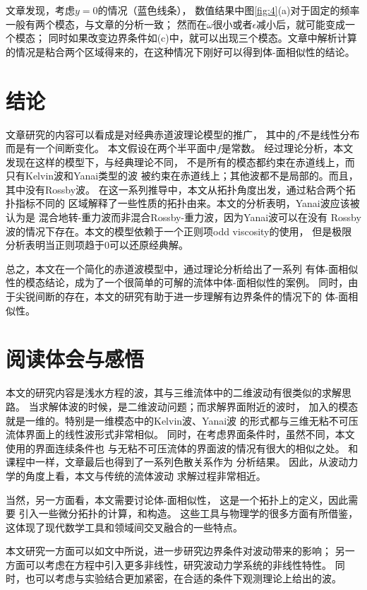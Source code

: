 \documentclass[UTF8,zihao=5]{ctexart} %
\begin{document}
文章发现，考虑$y=0$的情况（蓝色线条），
数值结果中图\ref{fig:4}(a)对于固定的频率一般有两个模态，与文章的分析一致；
然而在$\omega$很小或者$\epsilon$减小后，就可能变成一个模态；
同时如果改变边界条件如(c)中，就可以出现三个模态。文章中解析计算
的情况是粘合两个区域得来的，在这种情况下刚好可以得到体-面相似性的结论。

\section{结论}
文章研究的内容可以看成是对经典赤道波理论模型的推广，
其中的$f$不是线性分布而是有一个间断变化。
本文假设在两个半平面中$f$是常数。
经过理论分析，本文发现在这样的模型下，与经典理论不同，
不是所有的模态都约束在赤道线上，而只有Kelvin波和Yanai类型的波
被约束在赤道线上；其他波都不是局部的。而且，其中没有Rossby波。
在这一系列推导中，本文从拓扑角度出发，通过粘合两个拓扑指标不同的
区域解释了一些性质的拓扑由来。本文的分析表明，Yanai波应该被认为是
混合地转-重力波而非混合Rossby-重力波，因为Yanai波可以在没有
Rossby波的情况下存在。本文的模型依赖于一个正则项odd viscosity的使用，
但是极限分析表明当正则项趋于0可以还原经典解。

总之，本文在一个简化的赤道波模型中，通过理论分析给出了一系列
有体-面相似性的模态结论，成为了一个很简单的可解的流体中体-面相似性的案例。
同时，由于尖锐间断的存在，本文的研究有助于进一步理解有边界条件的情况下的
体-面相似性。

\section{阅读体会与感悟}
本文的研究内容是浅水方程的波，其与三维流体中的二维波动有很类似的求解思路。
当求解体波的时候，是二维波动问题；而求解界面附近的波时，
加入的模态就是一维的。特别是一维模态中的Kelvin波、Yanai波
的形式都与三维无粘不可压流体界面上的线性波形式非常相似。
同时，在考虑界面条件时，虽然不同，本文使用的界面连续条件也
与无粘不可压流体的界面波的情况有很大的相似之处。
和课程中一样，文章最后也得到了一系列色散关系作为
分析结果。
因此，从波动力学的角度上看，本文与传统的流体波动
求解过程非常相近。

当然，另一方面看，本文需要讨论体-面相似性，
这是一个拓扑上的定义，因此需要
引入一些微分拓扑的计算，和构造。
这些工具与物理学的很多方面有所借鉴，
这体现了现代数学工具和领域间交叉融合的一些特点。

本文研究一方面可以如文中所说，进一步研究边界条件对波动带来的影响；
另一方面可以考虑在方程中引入更多非线性，研究波动力学系统的非线性特性。
同时，也可以考虑与实验结合更加紧密，在合适的条件下观测理论上给出的波。
\end{document}
